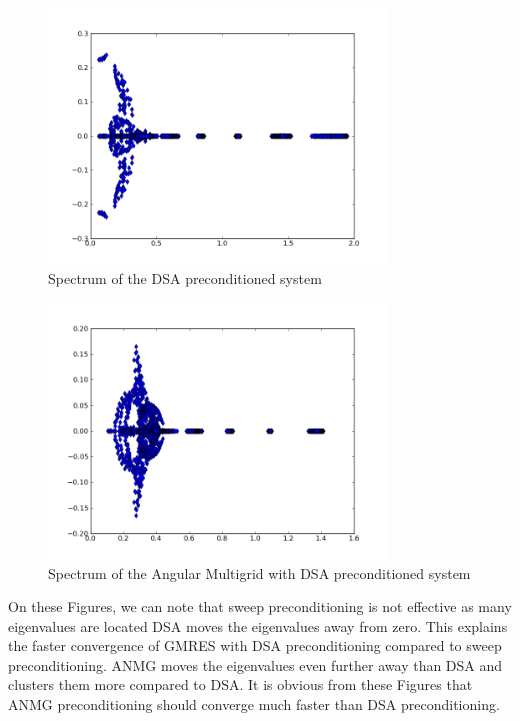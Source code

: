 \documentclass[preprint,10pt]{elsarticle}
\renewcommand{\(}{\left(}
\renewcommand{\)}{\right)}
\renewcommand{\[}{\left[}
\renewcommand{\]}{\right]}
\begin{document}
\begin{figure}[H]
\centering
\includegraphics[width=9cm]{d_s8_5_5}
\caption{Spectrum of the DSA preconditioned system}
\label{fig:spectrum_DSA}
\end{figure}

\begin{figure}[H]
\centering
\includegraphics[width=9cm]{p_s8_5_5}
\caption{Spectrum of the Angular Multigrid with DSA preconditioned system}
\label{fig:spectrum_ANMG}
\end{figure}

On these Figures, we can note that sweep preconditioning is not effective as many eigenvalues
are located DSA moves the eigenvalues away from
zero. This explains the faster convergence of GMRES with DSA preconditioning
compared to sweep preconditioning. ANMG moves the
eigenvalues even further away than DSA and clusters them more compared to DSA.
It is obvious from these Figures that ANMG preconditioning should converge much faster than
DSA preconditioning. %

\end{document}
